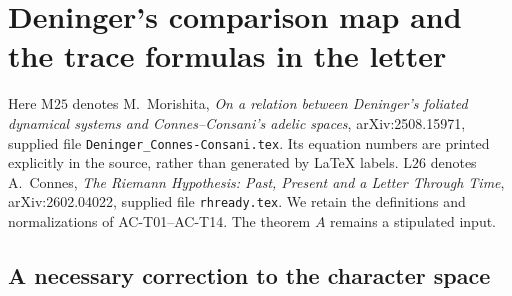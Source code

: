 \section{Deninger's comparison map and the trace formulas in the letter}
\label{sec:ACtracefollowup}

Here \(\mathrm{M25}\) denotes M.~Morishita,
\emph{On a relation between Deninger's foliated dynamical systems and
Connes--Consani's adelic spaces}, arXiv:2508.15971, supplied file
\texttt{Deninger\_Connes-Consani.tex}.  Its equation numbers are printed
explicitly in the source, rather than generated by LaTeX labels.
\(\mathrm{L26}\) denotes A.~Connes,
\emph{The Riemann Hypothesis: Past, Present and a Letter Through Time},
arXiv:2602.04022, supplied file \texttt{rhready.tex}.
We retain the definitions and normalizations of AC-T01--AC-T14.
The theorem \(A\) remains a stipulated input.

\subsection{A necessary correction to the character space}

